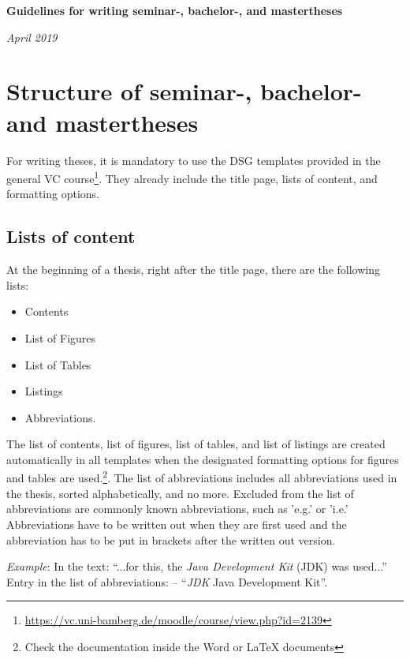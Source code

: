 
%

\atitle
%
\begin{center}
{\bf\huge Guidelines for writing seminar-, bachelor-, and mastertheses}

{\it April 2019}
\end{center}
%
\section{Structure of seminar-, bachelor- and mastertheses}
%

For writing theses, it is mandatory to use the DSG templates provided in the general VC course\footnote{\url{https://vc.uni-bamberg.de/moodle/course/view.php?id=2139}}. They already include the title page, lists of content, and formatting options.

\subsection{Lists of content}

At the beginning of a thesis, right after the title page, there are the following lists:

\begin{itemize}
	\item Contents
	\item List of Figures
	\item List of Tables
	\item Listings
	\item Abbreviations.
\end{itemize}

The list of contents, list of figures, list of tables, and list of listings are created automatically in all templates when the designated formatting options for figures and tables are used.\footnote{Check the documentation inside the Word or LaTeX documents}. 
The list of abbreviations includes all abbreviations used in the thesis, sorted alphabetically, and no more.
Excluded from the list of abbreviations are commonly known abbreviations, such as 'e.g.' or 'i.e.'
Abbreviations have to be written out when they are first used and the abbreviation has to be put in brackets after the written out version.

\textit{Example}: In the text: "`...for this, the \textit{Java Development Kit} (JDK) was used..."'\\
Entry in the list of abbreviations: -- "`\textit{JDK} \hspace{10pt} Java Development Kit"'.

